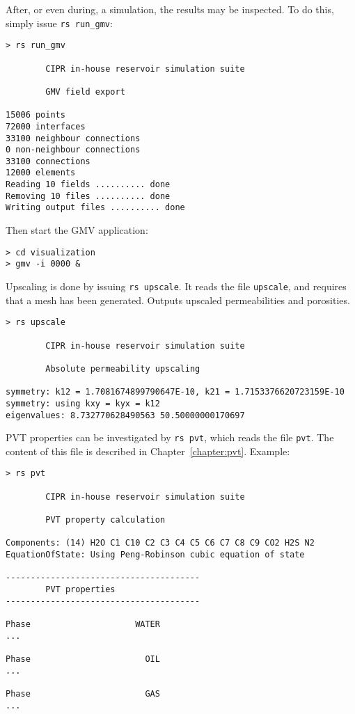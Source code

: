 After, or even during, a simulation, the results may be inspected. To
do this, simply issue \texttt{rs run\_gmv}:
\begin{verbatim}
> rs run_gmv

        CIPR in-house reservoir simulation suite

        GMV field export

15006 points
72000 interfaces
33100 neighbour connections
0 non-neighbour connections
33100 connections
12000 elements
Reading 10 fields .......... done
Removing 10 files .......... done
Writing output files .......... done
\end{verbatim}
Then start the GMV application:
\begin{verbatim}
> cd visualization
> gmv -i 0000 &
\end{verbatim}



Upscaling is done by issuing \texttt{rs upscale}. It reads the file
\texttt{upscale}, and requires that a mesh has been generated. Outputs
upscaled permeabilities and porosities.

\begin{verbatim}
> rs upscale

        CIPR in-house reservoir simulation suite

        Absolute permeability upscaling

symmetry: k12 = 1.7081674899790647E-10, k21 = 1.7153376620723159E-10
symmetry: using kxy = kyx = k12
eigenvalues: 8.732770628490563 50.50000000170697
\end{verbatim}

PVT properties can be investigated by \texttt{rs pvt}, which reads the
file \texttt{pvt}. The content of this file is described in
Chapter~\ref{chapter:pvt}. Example:

\begin{verbatim}
> rs pvt

        CIPR in-house reservoir simulation suite

        PVT property calculation

Components: (14) H2O C1 C10 C2 C3 C4 C5 C6 C7 C8 C9 CO2 H2S N2
EquationOfState: Using Peng-Robinson cubic equation of state

---------------------------------------
        PVT properties
---------------------------------------

Phase                     WATER
...

Phase                       OIL
...

Phase                       GAS
...
\end{verbatim}

